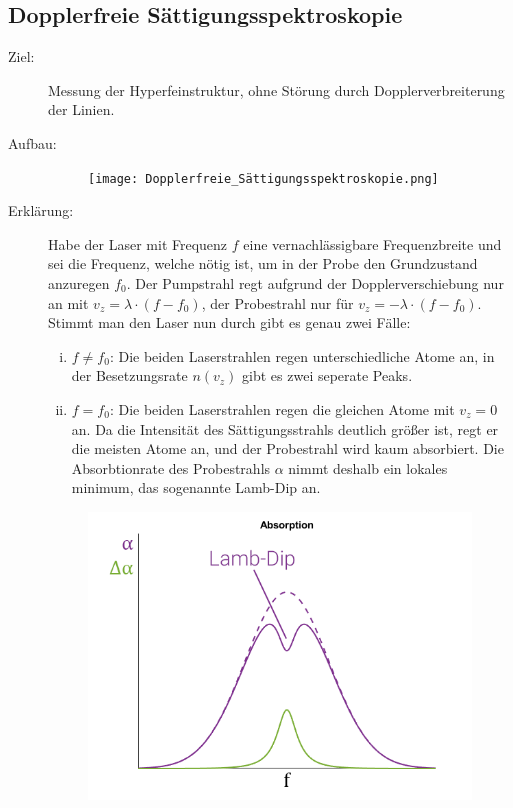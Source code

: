 \documentclass[twocolumn]{summery_4.1}
\begin{document}
\subsection{Dopplerfreie Sättigungsspektroskopie}
\begin{description}
    \item[Ziel:] Messung der Hyperfeinstruktur, ohne Störung durch Dopplerverbreiterung der Linien.
    
    \item[Aufbau:]
    \begin{figure}[H]
        \centering
        \texttt{[image: Dopplerfreie\_Sättigungsspektroskopie.png]}
    \end{figure}

    \item[Erklärung:]
    Habe der Laser mit Frequenz \(f\) eine vernachlässigbare Frequenzbreite und sei die Frequenz, welche nötig ist, um in der Probe den Grundzustand anzuregen \(f_0\). Der Pumpstrahl regt aufgrund der Dopplerverschiebung nur an mit \(v_z = \lambda\cdot(f-f_0)\), der Probestrahl nur für \(v_z = -\lambda\cdot(f-f_0)\). Stimmt man den Laser nun durch gibt es genau zwei Fälle:
    \begin{enumerate}[(i)]
        \item \(f\neq f_0\): Die beiden Laserstrahlen regen unterschiedliche Atome an, in der Besetzungsrate \(n(v_z)\) gibt es zwei seperate Peaks.
        \item \(f= f_0\): Die beiden Laserstrahlen regen die gleichen Atome mit \(v_z=0\) an. Da die Intensität des Sättigungsstrahls deutlich größer ist, regt er die meisten Atome an, und der Probestrahl wird kaum absorbiert. Die Absorbtionrate des Probestrahls \(\alpha\) nimmt deshalb ein lokales minimum, das sogenannte Lamb-Dip an. 
    \end{enumerate}   

    \begin{figure}[H]
        \centering
        \includegraphics[width=.35\textwidth]{Lamb-Dip.png}
    \end{figure}

\end{description}
\end{document}
